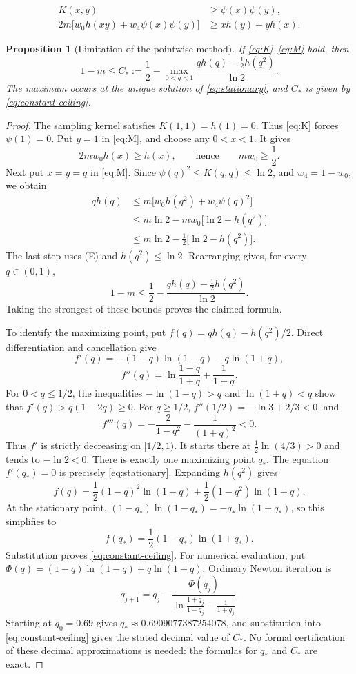 \documentclass[10pt,a4paper]{amsart}
\newtheorem{proposition}{Proposition}
\begin{document}
\begin{align}
K(x,y)&\ge\psi(x)\psi(y),\tag{K}\label{eq:K}\\
2m\bigl[w_0h(xy)+w_4\psi(x)\psi(y)\bigr]
&\ge xh(y)+yh(x).\tag{M}\label{eq:M}
\end{align}

\begin{proposition}[Limitation of the pointwise method]
\label{prop:sharper-ceiling}
If \eqref{eq:K}--\eqref{eq:M} hold, then
\[
1-m\le C_*:=
\frac12-\max_{0<q<1}
\frac{qh(q)-\frac12h(q^2)}{\ln2}.
\]
The maximum occurs at the unique solution of
\eqref{eq:stationary}, and \(C_*\) is given by
\eqref{eq:constant-ceiling}.
\end{proposition}

\begin{proof}
The sampling kernel satisfies \(K(1,1)=h(1)=0\).
Thus \eqref{eq:K} forces \(\psi(1)=0\).
Put \(y=1\) in \eqref{eq:M}, and choose any \(0<x<1\). It gives
\[
2mw_0h(x)\ge h(x),
\qquad\text{hence}\qquad mw_0\ge\frac12.
\tag{E}
\label{eq:endpoint-barrier}
\]
Next put \(x=y=q\) in \eqref{eq:M}. Since
\(\psi(q)^2\le K(q,q)\le\ln2\), and \(w_4=1-w_0\), we obtain
\[
\begin{aligned}
qh(q)
&\le m\bigl[w_0h(q^2)+w_4\psi(q)^2\bigr]\\
&\le m\ln2-mw_0\bigl[\ln2-h(q^2)\bigr]\\
&\le m\ln2-\frac12\bigl[\ln2-h(q^2)\bigr].
\end{aligned}
\]
The last step uses (E) and \(h(q^2)\le\ln2\).
Rearranging gives, for every \(q\in(0,1)\),
\[
1-m\le\frac12-\frac{qh(q)-\frac12h(q^2)}{\ln2}.
\tag{C}
\label{eq:ceiling-each-q}
\]
Taking the strongest of these bounds proves the claimed formula.

To identify the maximizing point, put \(f(q)=qh(q)-h(q^2)/2\).
Direct differentiation and cancellation give
\[
f'(q)=-(1-q)\ln(1-q)-q\ln(1+q),
\]
\[
f''(q)=\ln\frac{1-q}{1+q}+\frac1{1+q}.
\]
For \(0<q\le1/2\), the inequalities
\(-\ln(1-q)>q\) and \(\ln(1+q)<q\) show that
\(f'(q)>q(1-2q)\ge0\).
For \(q\ge1/2\), \(f''(1/2)=-\ln3+2/3<0\), and
\[
f'''(q)=-\frac2{1-q^2}-\frac1{(1+q)^2}<0.
\]
Thus \(f'\) is strictly decreasing on \([1/2,1)\).
It starts there at \(\frac12\ln(4/3)>0\) and tends to
\(-\ln2<0\). There is exactly one maximizing point \(q_*\).
The equation \(f'(q_*)=0\) is precisely
\eqref{eq:stationary}. Expanding \(h(q^2)\) gives
\[
f(q)=\frac12(1-q)^2\ln(1-q)
     +\frac12(1-q^2)\ln(1+q).
\]
At the stationary point,
\((1-q_*)\ln(1-q_*)=-q_*\ln(1+q_*)\), so this simplifies to
\[
f(q_*)=\frac12(1-q_*)\ln(1+q_*).
\]
Substitution proves \eqref{eq:constant-ceiling}.
For numerical evaluation, put
\(\Phi(q)=(1-q)\ln(1-q)+q\ln(1+q)\).
Ordinary Newton iteration is
\[
q_{j+1}=q_j-
\frac{\Phi(q_j)}
{\displaystyle\ln\frac{1+q_j}{1-q_j}-\frac1{1+q_j}}.
\]
Starting at \(q_0=0.69\) gives
\(q_*\approx0.6909077387254078\), and substitution into
\eqref{eq:constant-ceiling} gives the stated decimal value of \(C_*\).
No formal certification of these decimal approximations is needed:
the formulas for \(q_*\) and \(C_*\) are exact.
\end{proof}
\end{document}
